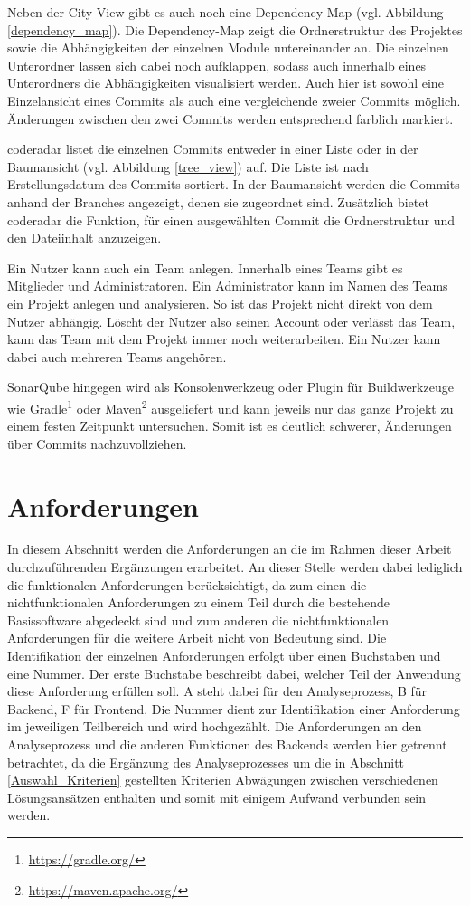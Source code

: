 \documentclass[
	oneside,  %
	ngerman, 
	final, 
	11pt, 
	a4paper, 
	1.1headlines, 
	headinclude=false, 
	footinclude=false, 
	mpinclude=false, 
	pagesize, 
	onecolumn, 
	titlepage, 
	parskip=half, 
	headsepline, 
	chapterprefix=false, 
	version=first, 
	listof=totoc, 
	bibliography=totoc, 
	toc=graduated, 
	fleqn
]{scrbook}
\begin{document}
Neben der City-View gibt es auch noch eine \glqq Dependency-Map\grqq{} (vgl. Abbildung \ref{dependency_map}).
Die Dependency-Map zeigt die Ordnerstruktur des Projektes sowie die Abhängigkeiten der einzelnen Module untereinander an.
Die einzelnen Unterordner lassen sich dabei noch aufklappen, sodass auch innerhalb eines Unterordners die Abhängigkeiten visualisiert werden.
Auch hier ist sowohl eine Einzelansicht eines Commits als auch eine vergleichende zweier Commits möglich.
Änderungen zwischen den zwei Commits werden entsprechend farblich markiert.

coderadar listet die einzelnen Commits entweder in einer Liste oder in der Baumansicht (vgl. Abbildung \ref{tree_view}) auf.
Die Liste ist nach Erstellungsdatum des Commits sortiert. 
In der Baumansicht werden die Commits anhand der Branches angezeigt, denen sie zugeordnet sind.
Zusätzlich bietet coderadar die Funktion, für einen ausgewählten Commit die Ordnerstruktur und den Dateiinhalt anzuzeigen.

Ein Nutzer kann auch ein Team anlegen.
Innerhalb eines Teams gibt es Mitglieder und Administratoren.
Ein Administrator kann im Namen des Teams ein Projekt anlegen und analysieren.
So ist das Projekt nicht direkt von dem Nutzer abhängig.
Löscht der Nutzer also seinen Account oder verlässt das Team, kann das Team mit dem Projekt immer noch weiterarbeiten.
Ein Nutzer kann dabei auch mehreren Teams angehören.

SonarQube hingegen wird als Konsolenwerkzeug oder Plugin für Buildwerkzeuge wie Gradle\footnote{\url{https://gradle.org/}} oder Maven\footnote{\url{https://maven.apache.org/}} ausgeliefert und kann jeweils nur das ganze Projekt zu einem festen Zeitpunkt untersuchen.
Somit ist es deutlich schwerer, Änderungen über Commits nachzuvollziehen.

\section{Anforderungen}
\label{Anforderungen}
In diesem Abschnitt werden die Anforderungen an die im Rahmen dieser Arbeit durchzuführenden Ergänzungen erarbeitet.
An dieser Stelle werden dabei lediglich die funktionalen Anforderungen berücksichtigt, da zum einen die nichtfunktionalen Anforderungen zu einem Teil durch die bestehende Basissoftware abgedeckt sind und zum anderen die nichtfunktionalen Anforderungen für die weitere Arbeit nicht von Bedeutung sind.
Die Identifikation der einzelnen Anforderungen erfolgt über einen Buchstaben und eine Nummer.
Der erste Buchstabe beschreibt dabei, welcher Teil der Anwendung diese Anforderung erfüllen soll.
\glqq A\grqq{} steht dabei für den Analyseprozess, \glqq B\grqq{} für Backend, \glqq F\grqq{} für Frontend.
Die Nummer dient zur Identifikation einer Anforderung im jeweiligen Teilbereich und wird hochgezählt.
Die Anforderungen an den Analyseprozess und die anderen Funktionen des Backends werden hier getrennt betrachtet, da die Ergänzung des Analyseprozesses um die in Abschnitt \ref{Auswahl_Kriterien} gestellten Kriterien Abwägungen zwischen verschiedenen Lösungsansätzen enthalten und somit mit einigem Aufwand verbunden sein werden.
\end{document}
